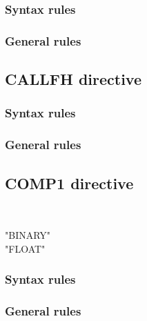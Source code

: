 \subsubsection{Syntax rules}

\subsubsection{General rules}

\subsection{CALLFH directive}

\begin{syntax}[\miscextcolour]
  \begin{0-1}
    \literal
  \end{0-1}
\end{syntax}

\subsubsection{Syntax rules}

\subsubsection{General rules}

\subsection{COMP1 directive}

\begin{syntax}[\miscextcolour]
  \begin{1=}
     \\
  \end{1=}
  \begin{1=}
    "BINARY" \\
    "FLOAT"
  \end{1=}
\end{syntax}

\subsubsection{Syntax rules}

\subsubsection{General rules}

